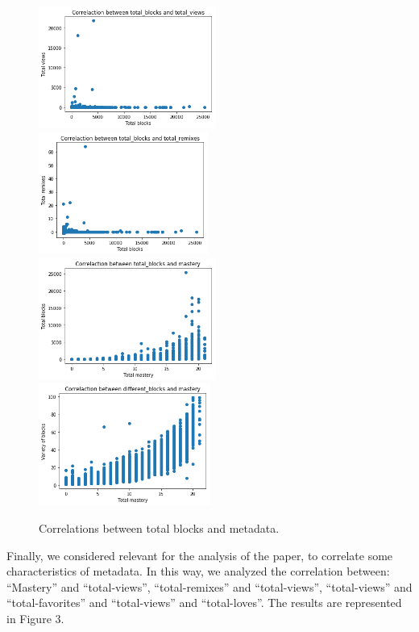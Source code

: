 \documentclass[a4paper,twocolumn,10pt]{article}
\begin{document}
\begin{figure}
\begin{center}
\includegraphics[height=4cm]{3.png}
\includegraphics[height=4cm]{4.png}
\includegraphics[height=4cm]{5.png}
\includegraphics[height=4cm]{new.png}
\caption{Correlations between total blocks and metadata.}
\end{center}
\end{figure}

Finally, we considered relevant for the analysis of the paper, to correlate some
characteristics of metadata. In this way, we analyzed the correlation between: 
``Mastery'' and ``total-views'', ``total-remixes'' and ``total-views'',
``total-views'' and ``total-favorites'' and ``total-views'' and ``total-loves''.
The results are represented in Figure 3.
\end{document}
